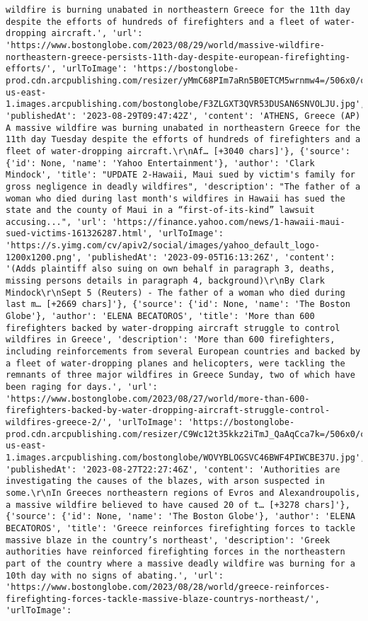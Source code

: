 \documentclass[
  letterpaper,
  DIV=11,
  numbers=noendperiod]{scrartcl}
\begin{document}
\begin{verbatim}
wildfire is burning unabated in northeastern Greece for the 11th day despite the efforts of hundreds of firefighters and a fleet of water-dropping aircraft.', 'url': 'https://www.bostonglobe.com/2023/08/29/world/massive-wildfire-northeastern-greece-persists-11th-day-despite-european-firefighting-efforts/', 'urlToImage': 'https://bostonglobe-prod.cdn.arcpublishing.com/resizer/yMmC68PIm7aRn5B0ETCM5wrnmw4=/506x0/cloudfront-us-east-1.images.arcpublishing.com/bostonglobe/F3ZLGXT3QVR53DUSAN6SNVOLJU.jpg', 'publishedAt': '2023-08-29T09:47:42Z', 'content': 'ATHENS, Greece (AP) A massive wildfire was burning unabated in northeastern Greece for the 11th day Tuesday despite the efforts of hundreds of firefighters and a fleet of water-dropping aircraft.\r\nAf… [+3040 chars]'}, {'source': {'id': None, 'name': 'Yahoo Entertainment'}, 'author': 'Clark Mindock', 'title': "UPDATE 2-Hawaii, Maui sued by victim's family for gross negligence in deadly wildfires", 'description': "The father of a woman who died during last month's wildfires in Hawaii has sued the state and the county of Maui in a “first-of-its-kind” lawsuit accusing...", 'url': 'https://finance.yahoo.com/news/1-hawaii-maui-sued-victims-161326287.html', 'urlToImage': 'https://s.yimg.com/cv/apiv2/social/images/yahoo_default_logo-1200x1200.png', 'publishedAt': '2023-09-05T16:13:26Z', 'content': '(Adds plaintiff also suing on own behalf in paragraph 3, deaths, missing persons details in paragraph 4, background)\r\nBy Clark Mindock\r\nSept 5 (Reuters) - The father of a woman who died during last m… [+2669 chars]'}, {'source': {'id': None, 'name': 'The Boston Globe'}, 'author': 'ELENA BECATOROS', 'title': 'More than 600 firefighters backed by water-dropping aircraft struggle to control wildfires in Greece', 'description': 'More than 600 firefighters, including reinforcements from several European countries and backed by a fleet of water-dropping planes and helicopters, were tackling the remnants of three major wildfires in Greece Sunday, two of which have been raging for days.', 'url': 'https://www.bostonglobe.com/2023/08/27/world/more-than-600-firefighters-backed-by-water-dropping-aircraft-struggle-control-wildfires-greece-2/', 'urlToImage': 'https://bostonglobe-prod.cdn.arcpublishing.com/resizer/C9Wc12t35kkz2iTmJ_QaAqCca7k=/506x0/cloudfront-us-east-1.images.arcpublishing.com/bostonglobe/WOVYBLOGSVC46BWF4PIWCBE37U.jpg', 'publishedAt': '2023-08-27T22:27:46Z', 'content': 'Authorities are investigating the causes of the blazes, with arson suspected in some.\r\nIn Greeces northeastern regions of Evros and Alexandroupolis, a massive wildfire believed to have caused 20 of t… [+3278 chars]'}, {'source': {'id': None, 'name': 'The Boston Globe'}, 'author': 'ELENA BECATOROS', 'title': 'Greece reinforces firefighting forces to tackle massive blaze in the country’s northeast', 'description': 'Greek authorities have reinforced firefighting forces in the northeastern part of the country where a massive deadly wildfire was burning for a 10th day with no signs of abating.', 'url': 'https://www.bostonglobe.com/2023/08/28/world/greece-reinforces-firefighting-forces-tackle-massive-blaze-countrys-northeast/', 'urlToImage': 
\end{verbatim}
\end{document}
